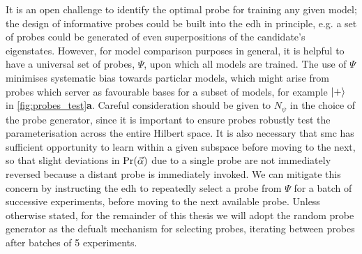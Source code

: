 It is an open challenge to identify the optimal \gls{probe} for training any given model;
    the design of informative probes could be built into the \gls{edh} in principle,
    e.g. a set of \glspl{probe} could be generated of even superpositions of the candidate's eigenstates.
However, for model comparison purposes in general, 
    it is helpful to have a universal set of probes, $\Psi$, upon which all models are trained. 
The use of $\Psi$ minimises systematic bias towards particlar models, 
    which might arise from probes which server as favourable bases for a subset of models, 
    for example $\ket{+}$ in \cref{fig:probes_test}\textbf{a}. 
Careful consideration should be given to $N_{\psi}$ in the choice of the \gls{probe} generator, 
    since it is important to ensure probes robustly test the parameterisation across the entire Hilbert space.
It is also necessary that \gls{smc} has sufficient opportunity to learn within a given subspace before moving to the next, 
    so that slight deviations in $\Pr(\vec{\alpha})$ due to a single probe are not immediately reversed because a distant probe is immediately invoked. 
We can mitigate this concern by instructing the \gls{edh} to repeatedly select a \gls{probe} from $\Psi$ for a batch of successive \glspl{experiment}, 
    before moving to the next available probe. 
Unless otherwise stated, for the remainder of this thesis we will adopt the random \gls{probe} 
    generator as the defualt mechanism for selecting probes,
    iterating between probes after batches of 5 \glspl{experiment}.
